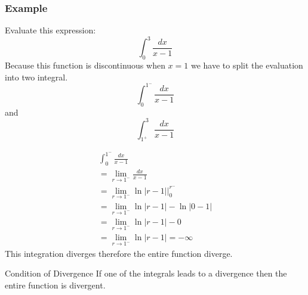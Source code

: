 \documentclass[letterpaper,10pt,twoside,twocolumn,openany]{book}
\begin{document}
\subsubsection{Example}
Evaluate this expression:
$$
    \int_0^3 \frac{dx}{x-1}
$$
Because this function is discontinuous when $x = 1$ we have to split the evaluation into two integral.
$$
    \int_0^{1^-} \frac{dx}{x-1}
$$
and
$$
    \int_{1^+}^3 \frac{dx}{x-1}
$$
\newpage
{}
\begin{gather*}
    \int_0^{1^-} \frac{dx}{x-1}\\ 
    = \lim_{r \to 1^-} \frac{dx}{x-1}\\ 
    = \lim_{r \to 1^-} \ln|r-1|\biggl|_0^{r^-}\\ 
    = \lim_{r \to 1^-} \ln|r-1| - \ln|0-1|\\ 
    = \lim_{r \to 1^-} \ln|r-1| - 0\\ 
    = \lim_{r \to 1^-} \ln|r-1| = -\infty
\end{gather*}    
This integration diverges therefore the entire function diverge.
\begin{DndComment}{Condition of Divergence}
    If one of the integrals leads to a divergence then the entire function is divergent.
\end{DndComment}
\end{document}

